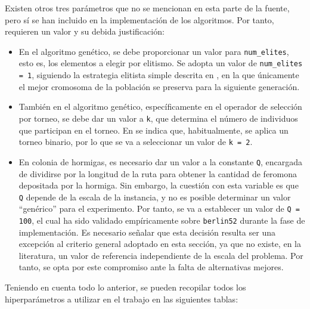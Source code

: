 Existen otros tres parámetros que no se mencionan en esta parte de la fuente, pero sí se han incluido en la implementación de
los algoritmos. Por tanto, requieren un valor y su debida justificación:
\begin{itemize}
  \item En el algoritmo genético, se debe proporcionar un valor para \texttt{num\_elites}, esto es, los elementos a elegir por
  elitismo. Se adopta un valor de \texttt{num\_elites = 1}, siguiendo la estrategia elitista simple descrita en 
  \cite{abdoun2012}, en la que únicamente el mejor cromosoma de la población se preserva para la siguiente generación.
  \item También en el algoritmo genético, específicamente en el operador de selección por torneo, se debe dar un valor a 
  \texttt{k}, que determina el número de individuos que participan en el torneo. En \cite{razali2011} se indica que, 
  habitualmente, se aplica un torneo binario, por lo que se va a seleccionar un valor de \texttt{k = 2}.
  \item En colonia de hormigas, es necesario dar un valor a la constante \texttt{Q}, encargada de dividirse por la longitud de
  la ruta para obtener la cantidad de feromona depositada por la hormiga. Sin embargo, la cuestión con esta variable es que 
  \texttt{Q} depende de la escala de la instancia, y no es posible determinar un valor ``genérico'' para el experimento. Por 
  tanto, se va a establecer un valor de \texttt{Q = 100}, el cual ha sido validado empíricamente sobre \texttt{berlin52}
  durante la fase de implementación. Es necesario señalar que esta decisión resulta ser una excepción al criterio general 
  adoptado en esta sección, ya que no existe, en la literatura, un valor de referencia independiente de la escala del problema.
  Por tanto, se opta por este compromiso ante la falta de alternativas mejores.
\end{itemize}

Teniendo en cuenta todo lo anterior, se pueden recopilar todos los hiperparámetros a utilizar en el trabajo en las siguientes
tablas:

